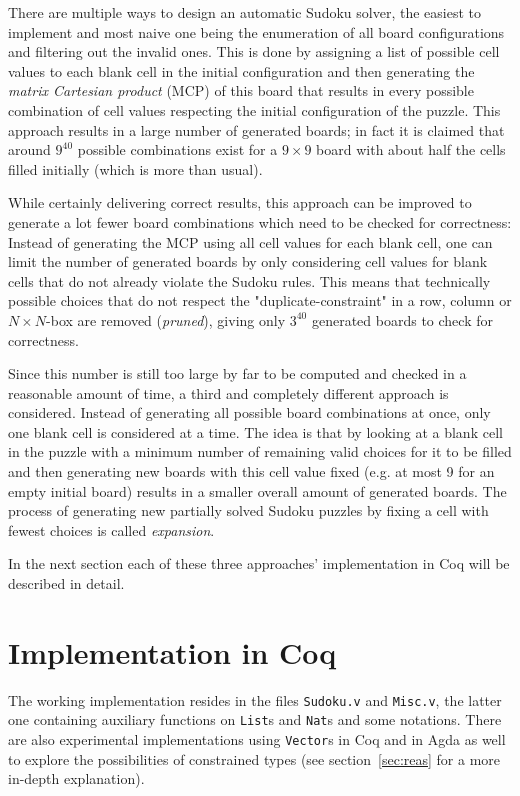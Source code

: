 \documentclass[a4paper,11pt]{article}
\begin{document}
There are multiple ways to design an automatic Sudoku solver, the easiest to implement and most naive one being the enumeration of all board configurations and filtering out the invalid ones. This is done by assigning a list of possible cell values to each blank cell in the initial configuration and then generating the \textit{matrix Cartesian product} (MCP) of this board that results in every possible combination of cell values respecting the initial configuration of the puzzle. This approach results in a large number of generated boards; in fact it is claimed that around \(9^{40}\) possible combinations exist for a \(9 \times 9\) board with about half the cells filled initially (which is more than usual).

While certainly delivering correct results, this approach can be improved to generate a lot fewer board combinations which need to be checked for correctness: Instead of generating the MCP using all cell values for each blank cell, one can limit the number of generated boards by only considering cell values for blank cells that do not already violate the Sudoku rules. This means that technically possible choices that do not respect the "duplicate-constraint" in a row, column or \(N \times N\)-box are removed (\textit{pruned}), giving only \(3^{40}\) generated boards to check for correctness.

Since this number is still too large by far to be computed and checked in a reasonable amount of time, a third and completely different approach is considered. Instead of generating all possible board combinations at once, only one blank cell is considered at a time. The idea is that by looking at a blank cell in the puzzle with a minimum number of remaining valid choices for it to be filled and then generating new boards with this cell value fixed (e.g. at most 9 for an empty initial board) results in a smaller overall amount of generated boards. The process of generating new partially solved Sudoku puzzles by fixing a cell with fewest choices is called \textit{expansion}.

In the next section each of these three approaches' implementation in Coq will be described in detail.

\section{Implementation in Coq}
\label{sec:impl}
The working implementation resides in the files \texttt{Sudoku.v} and \texttt{Misc.v}, the latter one containing auxiliary functions on \texttt{List}s and \texttt{Nat}s and some notations. There are also experimental implementations using \texttt{Vector}s in Coq and in Agda as well to explore the possibilities of constrained types (see section~\ref{sec:reas} for a more in-depth explanation).
\end{document}
